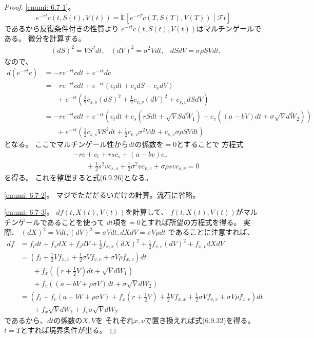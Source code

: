 \documentclass[uplatex]{jsarticle}
\theoremstyle{definition}
\def\E{\mathbb{E}}
\def\mcF{\mathcal{F}}
\begin{document}
\begin{proof}
  \ref{enumi: 6.7-1}。
  \[
  e^{-rt}c(t,S(t),V(t))
  = \tilde{\E}\left[ e^{-rT}c(T,S(T),V(T)) \middle| \mcF{t} \right]
  \]
  であるから反復条件付きの性質より
  \(e^{-rt}c(t,S(t),V(t))\)はマルチンゲールである。
  微分を計算する。
  \begin{align*}
    &(dS)^2 = VS^2dt,
    &(dV)^2 = \sigma^2Vdt,
    &dSdV = \sigma \rho SVdt,
  \end{align*}
  なので、
  \begin{align*}
    d(e^{-rt}c)
    &= -re^{-rt}c dt + e^{-rt}dc \\
    &= -re^{-rt}c dt +
    e^{-rt}(c_tdt + c_sdS + c_vdV) \\
    &\ \ \ \ \ \ \ \
    + e^{-rt}\left( \frac{1}{2}c_{s,s}(dS)^2
    + \frac{1}{2}c_{v,v}(dV)^2 + c_{s,v}dSdV \right) \\
    &= -re^{-rt}c dt + e^{-rt}
    \left( c_tdt + c_s(rSdt + \sqrt{V}Sd\tilde{W}_1)
    + c_v((a-bV)dt + \sigma\sqrt{V}d\tilde{W}_2) \right) \\
    &\ \ \ \ \ \ \ \
    + e^{-rt}\left( \frac{1}{2}c_{s,s}VS^2dt
    + \frac{1}{2}c_{v,v}\sigma^2Vdt
    + c_{s,v}\sigma \rho SVdt \right)
  \end{align*}
  となる。
  ここでマルチンゲール性から\(dt\)の係数を\(=0\)とすることで
  方程式
  \begin{align*}
    &-rc + c_t + rsc_s + (a-bv)c_v \\
    &\ \ \ \ \ \ \ \
    + \frac{1}{2}s^2vc_{s,s}
    + \frac{1}{2}\sigma^2vc_{v,v}
    + \sigma \rho svc_{s,v} = 0
  \end{align*}
  を得る。
  これを整理すると式(6.9.26)となる。

  \ref{enumi: 6.7-2}。
  マジでただだるいだけの計算。流石に省略。

  \ref{enumi: 6.7-3}。
  \(df(t,X(t),V(t))\)を計算して、
  \(f(t,X(t),V(t))\)がマルチンゲールであることを使って
  \(dt\)項を\(=0\)とすれば所望の方程式を得る。
  実際、
  \((dX)^2 = Vdt, (dV)^2 = \sigma Vdt, dXdV = \sigma V\rho dt\)
  であることに注意すれば、
  \begin{align*}
    df
    &= f_tdt + f_xdX + f_vdV + \frac{1}{2}f_{x,x}(dX)^2 +
    \frac{1}{2}f_{v,v}(dV)^2 + f_{x,v}dXdV \\
    &= \left( f_t + \frac{1}{2}V f_{x,x} + \frac{1}{2}\sigma V f_{v,v}
    + \sigma V \rho f_{x,v}\right) dt \\
    &\ \ \ \ \ \ \ \
    + f_x\left(  \left( r + \frac{1}{2}V\right) dt + \sqrt{V} dW_1\right) \\
    &\ \ \ \ \ \ \ \
    + f_v\left(  \left( a-bV+\rho\sigma V\right) dt
    + \sigma\sqrt{V} dW_2\right) \\
    &= \left( f_t + f_v \left( a-bV+\rho\sigma V\right)
    + f_x \left( r + \frac{1}{2}V\right)
    + \frac{1}{2}V f_{x,x} + \frac{1}{2}\sigma V f_{v,v}
    + \sigma V \rho f_{x,v} \right)dt \\
    &\ \ \ \ \ \ \ \
    + f_x\sqrt{V} dW_1 + f_v\sigma\sqrt{V} dW_2
  \end{align*}
  であるから、\(dt\)の係数の\(X,V\)を
  それぞれ\(x,v\)で置き換えれば式(6.9.32)を得る。
  \(t=T\)とすれば境界条件が出る。


\end{proof}
\end{document}
